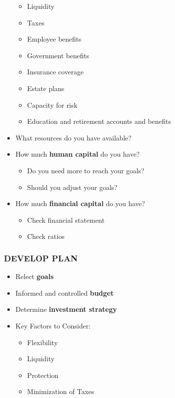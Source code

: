 \documentclass[12pt]{article}
\begin{document}
\begin{itemize}
\begin{itemize}
                            \item Liquidity
                            \item Taxes
                            \item Employee benefits
                            \item Government benefits
                            \item Insurance coverage
                            \item Estate plans
                            \item Capacity for risk
                            \item Education and retirement accounts and benefits
                        \end{itemize}
                    \item What resources do you have available?
                    \item How much \textbf{human capital} do you have?
                        \begin{itemize}
                            \item Do you need more to reach your goals?
                            \item Should you adjust your goals?
                        \end{itemize}
                    \item How much \textbf{financial capital} do you have?
                        \begin{itemize}
                            \item Check financial statement
                            \item Check ratios
                        \end{itemize}       
                \end{itemize}
            \subsubsection{DEVELOP PLAN}
                \begin{itemize}
                    \item Relect \textbf{goals}
                    \item Informed and controlled \textbf{budget}
                    \item Determine \textbf{investment strategy}
                    \item Key Factors to Consider:
                        \begin{itemize}
                            \item Flexibility
                            \item Liquidity
                            \item Protection
                            \item Minimization of Taxes
                        \end{itemize}
                \end{itemize}
\end{document}
